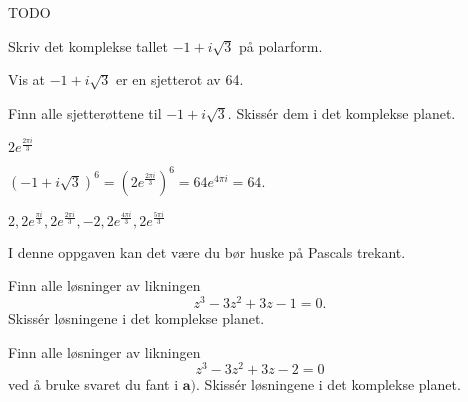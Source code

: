 \begin{losning}
TODO
\end{losning}




\begin{oppgave}
\begin{punkt}
Skriv det komplekse tallet $-1+i\sqrt{3}$ på polarform.
\end{punkt}

\begin{punkt}
Vis at $-1+i\sqrt{3}$ er en sjetterot av 64.
\end{punkt}

\begin{punkt}
Finn alle sjetterøttene til $-1+i\sqrt{3}$. Skissér dem i det komplekse planet.
\end{punkt}

\end{oppgave}

\begin{losning}
\begin{punkt}
$2e^{\frac{2\pi i}{3}}$
\end{punkt}

\begin{punkt}
$(-1+i\sqrt{3})^6=(2e^{\frac{2\pi i}{3}})^6=64e^{4\pi i}=64.$
\end{punkt}

\begin{punkt}
$2,2e^{\frac{\pi i}{3}},2e^{\frac{2\pi i}{3}},-2,2e^{\frac{4\pi i}{3}},2e^{\frac{5\pi i}{3}}$


\begin{center}
\end{center}


\end{punkt}

\end{losning}


\begin{oppgave}
I denne oppgaven kan det være du bør huske på Pascals trekant.
\begin{punkt}
Finn alle løsninger av likningen $$z^3-3z^2+3z-1=0.$$ Skissér løsningene i det komplekse planet.
\end{punkt}
\begin{punkt}
Finn alle løsninger av likningen $$z^3-3z^2+3z-2=0$$ ved å bruke svaret du fant i $\textbf{a)}$. Skissér løsningene i det komplekse planet.
\end{punkt}
\end{oppgave}

